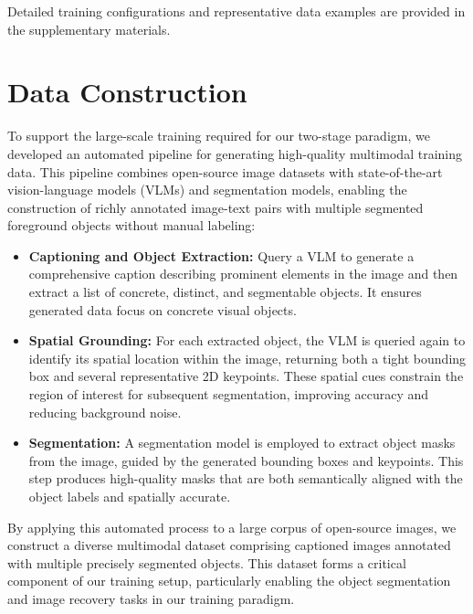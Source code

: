 Detailed training configurations and representative data examples are provided in the supplementary materials.


\section{Data Construction}
\label{app:data_construct}

To support the large-scale training required for our two-stage paradigm, we developed an automated pipeline for generating high-quality multimodal training data. This pipeline combines open-source image datasets with state-of-the-art vision-language models (VLMs) and segmentation models, enabling the construction of richly annotated image-text pairs with multiple segmented foreground objects without manual labeling:
\begin{itemize}[left=2pt]
    \item \textbf{Captioning and Object Extraction:} Query a VLM to generate a comprehensive caption describing prominent elements in the image and then extract a list of concrete, distinct, and segmentable objects. It ensures generated data focus on concrete visual objects.
    \item \textbf{Spatial Grounding:} For each extracted object, the VLM is queried again to identify its spatial location within the image, returning both a tight bounding box and several representative 2D keypoints. These spatial cues constrain the region of interest for subsequent segmentation, improving accuracy and reducing background noise.
    \item \textbf{Segmentation:} A segmentation model is employed to extract object masks from the image, guided by the generated bounding boxes and keypoints. This step produces high-quality masks that are both semantically aligned with the object labels and spatially accurate.
\end{itemize}
By applying this automated process to a large corpus of open-source images, we construct a diverse multimodal dataset comprising captioned images annotated with multiple precisely segmented objects. This dataset forms a critical component of our training setup, particularly enabling the object segmentation and image recovery tasks in our training paradigm.




